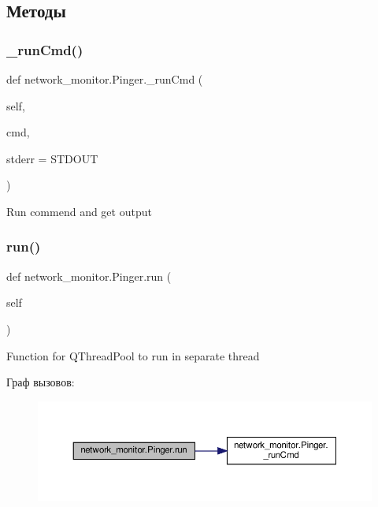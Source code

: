 \subsection{Методы}
\mbox{\label{classnetwork__monitor_1_1_pinger_a8fa23184da9cbc4a3cafa6b08aee2cde}} 
\subsubsection{\texorpdfstring{\+\_\+run\+Cmd()}{\_runCmd()}}
{\footnotesize\ttfamily def network\+\_\+monitor.\+Pinger.\+\_\+run\+Cmd (\begin{DoxyParamCaption}\item[{}]{self,  }\item[{}]{cmd,  }\item[{}]{stderr = {\ttfamily STDOUT} }\end{DoxyParamCaption})\hspace{0.3cm}{\ttfamily [private]}}

\begin{DoxyVerb}Run commend and get output \end{DoxyVerb}
 \mbox{\label{classnetwork__monitor_1_1_pinger_aa316109fda2807e15b9edaa947f4a724}} 
\subsubsection{\texorpdfstring{run()}{run()}}
{\footnotesize\ttfamily def network\+\_\+monitor.\+Pinger.\+run (\begin{DoxyParamCaption}\item[{}]{self }\end{DoxyParamCaption})}

\begin{DoxyVerb}Function for QThreadPool to run in separate thread \end{DoxyVerb}
 Граф вызовов\+:\nopagebreak
\begin{figure}[H]
\begin{center}
\leavevmode
\includegraphics[width=350pt]{classnetwork__monitor_1_1_pinger_aa316109fda2807e15b9edaa947f4a724_cgraph}
\end{center}
\end{figure}


